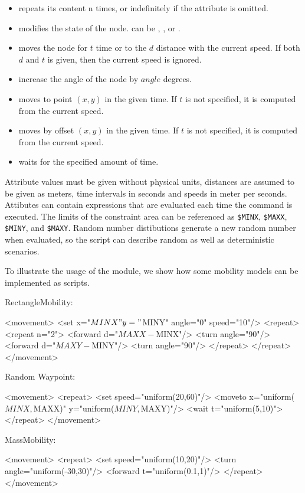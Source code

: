 \begin{itemize}
\item {} repeats its content n times, or indefinitely if 
       the  attribute is omitted.
\item {} modifies the state of the node.
       can be , ,  
      or . 
\item {} moves the node for $t$ time or to the $d$ distance
      with the current speed. If both $d$ and $t$ is given, then the current
      speed is ignored.
\item {} increase the angle of the node by $angle$ degrees.
\item {} moves to point $(x,y)$ in the given time. If
      $t$ is not specified, it is computed from the current speed.
\item {} moves by offset $(x,y)$ in the given time. If
      $t$ is not specified, it is computed from the current speed.
\item {} waits for the specified amount of time.
\end{itemize}

Attribute values must be given without physical units, distances are assumed
to be given as meters, time intervals in seconds and speeds in meter per seconds.
Attibutes can contain expressions that are evaluated each time the
command is executed. The limits of the constraint area can be
referenced as \verb!$MINX!, \verb!$MAXX!, \verb!$MINY!, and \verb!$MAXY!.
Random number distibutions generate a new random number when evaluated,
so the script can describe random as well as deterministic scenarios.

To illustrate the usage of the module, we show how some mobility
models can be implemented as scripts.

RectangleMobility:

\begin{XML}
<movement>
    <set x="$MINX" y="$MINY" angle="0" speed="10"/>
    <repeat>
        <repeat n="2">
            <forward d="$MAXX-$MINX"/>
            <turn angle="90"/>
            <forward d="$MAXY-$MINY"/>
            <turn angle="90"/>
        </repeat>
    </repeat>
</movement>
\end{XML}

Random Waypoint:

\begin{XML}
<movement>
    <repeat>
        <set speed="uniform(20,60)"/>
        <moveto x="uniform($MINX,$MAXX)" y="uniform($MINY,$MAXY)"/>
        <wait t="uniform(5,10)">
    </repeat>
</movement>
\end{XML}

MassMobility:

\begin{XML}
<movement>
    <repeat>
        <set speed="uniform(10,20)"/>
        <turn angle="uniform(-30,30)"/>
        <forward t="uniform(0.1,1)"/>
    </repeat>
</movement>
\end{XML}




